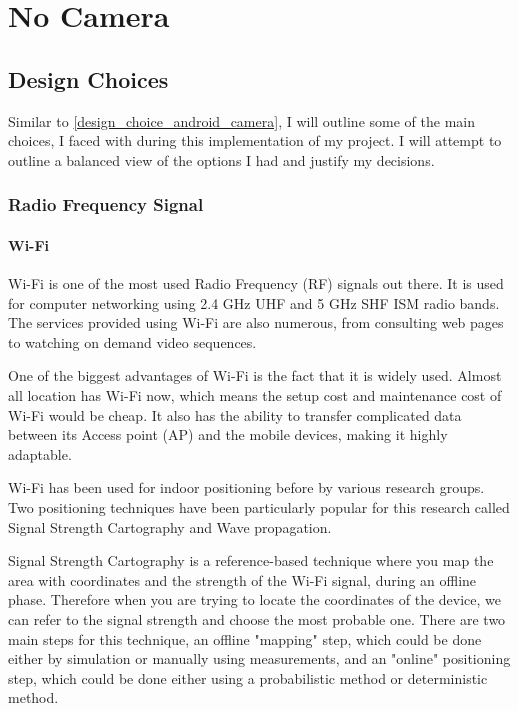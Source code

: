 \chapter{No Camera}

\label{ch:no_camera}

\section{Design Choices}
Similar to \ref{design_choice_android_camera}, I will outline some of the main choices, I faced with during this implementation of my project. I will attempt to outline a balanced view of the options I had and justify my decisions.
\subsection{Radio Frequency Signal}

\subsubsection{Wi-Fi}

Wi-Fi is one of the most used Radio Frequency (RF) signals out there.
It is used for computer networking using 2.4 GHz UHF and 5 GHz SHF
ISM radio bands\cite{wifi-wikipedia}. The services provided using Wi-Fi are also
numerous, from consulting web pages to watching on demand video sequences. 

One of the biggest advantages of Wi-Fi is the fact that it is
widely used. Almost all location has Wi-Fi now, which means the setup
cost and maintenance cost of Wi-Fi would be cheap. It also has the
ability to transfer complicated data between its Access point (AP)
and the mobile devices, making it highly adaptable. 

Wi-Fi has been used for indoor positioning before by various research
groups\cite{wifi-indoor}. Two positioning techniques have been particularly popular for this research
called Signal Strength Cartography and Wave propagation. 

Signal Strength Cartography\cite{sig-cart} is a reference-based technique where you map the area
with coordinates and the strength of the Wi-Fi signal, during an offline phase. Therefore when you
are trying to locate the coordinates of the device, we can refer to the signal strength and choose the most probable one. There are two main steps
for this technique, an offline "mapping" step, which could be done either
by simulation or manually using measurements, and an "online" positioning
step, which could be done either using a probabilistic method or deterministic
method. 

